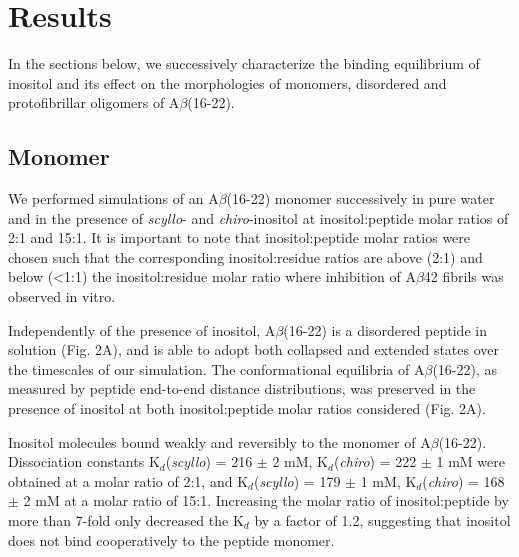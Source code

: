 \section{Results}

In the sections below, we successively characterize the binding equilibrium of inositol and its effect on the morphologies of monomers, disordered and protofibrillar oligomers of A$\beta$(16-22).  


\subsection{Monomer}

We performed simulations of an A$\beta$(16-22) monomer successively in pure water and in the presence of \emph{scyllo}- and \emph{chiro}-inositol at inositol:peptide molar ratios of 2:1 and 15:1.  It is important to note that inositol:peptide molar ratios were chosen such that the corresponding inositol:residue ratios are above (2:1) and below (<1:1) the inositol:residue molar ratio where inhibition of A$\beta$42 fibrils was observed in vitro.\cite{McLaurin:1998p176}

Independently of the presence of inositol, A$\beta$(16-22) is a disordered peptide in solution (Fig. 2A), and is able to adopt both collapsed and extended states over the timescales of our simulation. The conformational equilibria of A$\beta$(16-22), as measured by peptide end-to-end distance distributions, was preserved in the presence of inositol at both inositol:peptide molar ratios considered (Fig. 2A).  

Inositol molecules bound weakly and reversibly to the monomer of A$\beta$(16-22). Dissociation constants K$_d$(\emph{scyllo}) = 216 $\pm$ 2 mM, K$_d$(\emph{chiro}) = 222 $\pm$ 1 mM were obtained at a molar ratio of 2:1, and K$_d$(\emph{scyllo}) = 179 $\pm$ 1 mM, K$_d$(\emph{chiro}) = 168 $\pm$ 2 mM at a molar ratio of 15:1. Increasing the molar ratio of inositol:peptide by more than 7-fold only decreased the K$_d$ by a factor of 1.2, suggesting that inositol does not bind cooperatively to the peptide monomer.


